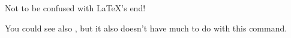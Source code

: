 
Not to be confused with LaTeX's end!

You could see also , but it also doesn't have much to do with this
command.

